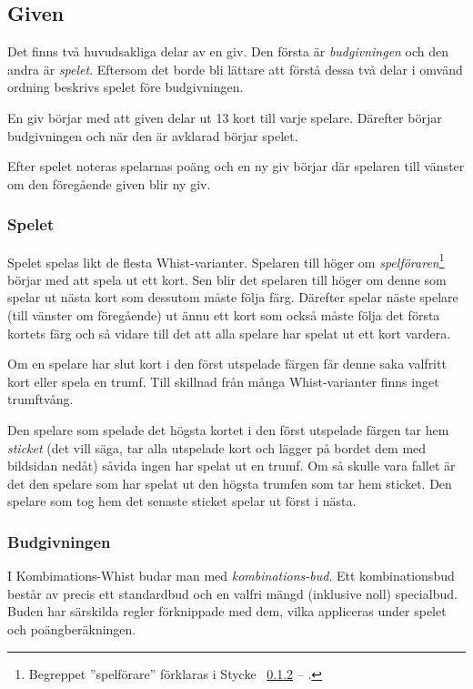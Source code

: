 \documentclass[a4paper]{article}
\renewcommand{\sectionref}[1]{%
	\ref{sec:#1} -- \nameref{sec:#1}%
}
\begin{document}
		\subsection{Given}
			Det finns två huvudsakliga delar av en giv. Den första är \emph{budgivningen} och den andra är \emph{spelet}. Eftersom det borde bli lättare att förstå dessa två delar i omvänd ordning beskrivs spelet före budgivningen.

			En giv börjar med att given delar ut 13 kort till varje spelare. Därefter börjar budgivningen och när den är avklarad börjar spelet.

			Efter spelet noteras spelarnas poäng och en ny giv börjar där spelaren till vänster om den föregående given blir ny giv.

			\subsubsection{Spelet}
				Spelet spelas likt de flesta Whist-varianter. Spelaren till höger om \emph{spelföraren}\footnote{Begreppet ''spelförare'' förklaras i Stycke~\sectionref{bidding}.} börjar med att spela ut ett kort. Sen blir det spelaren till höger om denne som spelar ut nästa kort som dessutom måste följa färg. Därefter spelar näste spelare (till vänster om föregående) ut ännu ett kort som också måste följa det första kortets färg och så vidare till det att alla spelare har spelat ut ett kort vardera.

				Om en spelare har slut kort i den först utspelade färgen får denne saka valfritt kort eller spela en trumf. Till skillnad från många Whist-varianter finns inget trumftvång.

				Den spelare som spelade det högsta kortet i den först utspelade färgen tar hem \emph{sticket} (det vill säga, tar alla utspelade kort och lägger på bordet dem med bildsidan nedåt) såvida ingen har spelat ut en trumf. Om så skulle vara fallet är det den spelare som har spelat ut den högsta trumfen som tar hem sticket. Den spelare som tog hem det senaste sticket spelar ut först i nästa.

			\subsubsection{Budgivningen}
				\label{sec:bidding}
				I Kombimations-Whist budar man med \emph{kombinations-bud}. Ett kombinationsbud består av precis ett standardbud och en valfri mängd (inklusive noll) specialbud. Buden har särskilda regler förknippade med dem, vilka appliceras under spelet och poängberäkningen.
\end{document}

